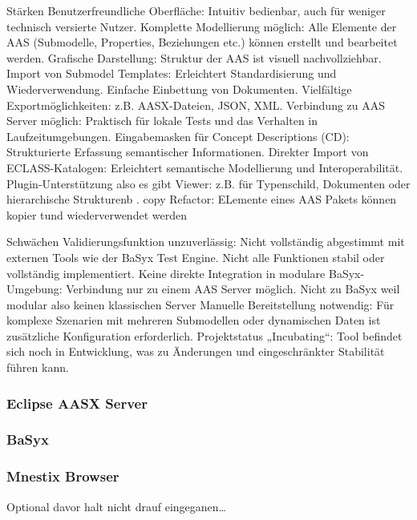 Stärken
Benutzerfreundliche Oberfläche: Intuitiv bedienbar, auch für weniger technisch versierte Nutzer.
Komplette Modellierung möglich: Alle Elemente der AAS (Submodelle, Properties, Beziehungen etc.) können erstellt und bearbeitet werden.
Grafische Darstellung: Struktur der AAS ist visuell nachvollziehbar.
Import von Submodel Templates: Erleichtert Standardisierung und Wiederverwendung.
Einfache Einbettung von Dokumenten.
Vielfältige Exportmöglichkeiten: z.B. AASX-Dateien, JSON, XML.
Verbindung zu AAS Server möglich: Praktisch für lokale Tests und das Verhalten in Laufzeitumgebungen.
Eingabemasken für Concept Descriptions (CD): Strukturierte Erfassung semantischer Informationen.
Direkter Import von ECLASS-Katalogen: Erleichtert semantische Modellierung und Interoperabilität.
Plugin-Unterstützung also es gibt Viewer: z.B. für Typenschild, Dokumenten oder hierarchische Strukturenb .
copy Refactor: ELemente eines AAS Pakets können kopier tund wiederverwendet werden


Schwächen
Validierungsfunktion unzuverlässig: Nicht vollständig abgestimmt mit externen Tools wie der BaSyx Test Engine.
Nicht alle Funktionen stabil oder vollständig implementiert.
Keine direkte Integration in modulare BaSyx-Umgebung: Verbindung nur zu einem AAS Server möglich. Nicht zu BaSyx weil modular also keinen klassischen Server
Manuelle Bereitstellung notwendig: Für komplexe Szenarien mit mehreren Submodellen oder dynamischen Daten ist zusätzliche Konfiguration erforderlich.
Projektstatus „Incubating“: Tool befindet sich noch in Entwicklung, was zu Änderungen und eingeschränkter Stabilität führen kann.

\subsubsection{Eclipse AASX Server}
\subsubsection{BaSyx}
\subsubsection{Mnestix Browser}
Optional davor halt nicht drauf eingeganen\dots
